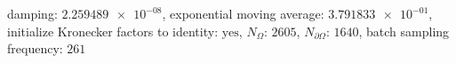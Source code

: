 damping: $\num[scientific-notation=true]{2.259489e-08}$, exponential moving average: $\num[scientific-notation=true]{3.791833e-01}$, initialize Kronecker factors to identity: $\text{yes}$, $N_{\Omega}$: $\num[scientific-notation=false]{2605}$, $N_{\partial\Omega}$: $\num[scientific-notation=false]{1640}$, batch sampling frequency: $\num[scientific-notation=false]{261}$